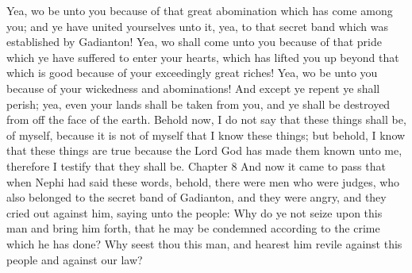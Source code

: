 Yea, wo be unto you because of that great abomination which has come among you; and ye have united yourselves unto it, yea, to that secret band which was established by Gadianton!
\bverse \iffalse Yea, wo shall come unto you because of that pride which ye have suffered to enter your hearts, which has lifted you up beyond that which is good because of your exceedingly great riches! \fi
Yea, wo shall come unto you because of that pride which ye have suffered to enter your hearts, which has lifted you up beyond that which is good because of your exceedingly great riches!
\bverse \iffalse Yea, wo be unto you because of your wickedness and abominations! \fi
Yea, wo be unto you because of your wickedness and abominations!
\bverse \iffalse And except ye repent ye shall perish; yea, even your lands shall be taken from you, and ye shall be destroyed from off the face of the earth. \fi
And except ye repent ye shall perish; yea, even your lands shall be taken from you, and ye shall be destroyed from off the face of the earth.
\bverse \iffalse Behold now, I do not say that these things shall be, of myself, because it is not of myself that I know these things; but behold, I know that these things are true because the Lord God has made them known unto me, therefore I testify that they shall be. \fi
Behold now, I do not say that these things shall be, of myself, because it is not of myself that I know these things; but behold, I know that these things are true because the Lord God has made them known unto me, therefore I testify that they shall be.
Chapter 8
\bchapter
\bverse \iffalse And now it came to pass that when Nephi had said these words, behold, there were men who were judges, who also belonged to the secret band of Gadianton, and they were angry, and they cried out against him, saying unto the people: Why do ye not seize upon this man and bring him forth, that he may be condemned according to the crime which he has done? \fi
And now it came to pass that when Nephi had said these words, behold, there were men who were judges, who also belonged to the secret band of Gadianton, and they were angry, and they cried out against him, saying unto the people: Why do ye not seize upon this man and bring him forth, that he may be condemned according to the crime which he has done?
\bverse \iffalse Why seest thou this man, and hearest him revile against this people and against our law? \fi
Why seest thou this man, and hearest him revile against this people and against our law?
\bverse \iffalse For behold, Nephi had spoken unto them concerning the corruptness of their law; yea, many things did Nephi speak which cannot be written; and nothing did he speak which was contrary to the commandments of God. \fi
